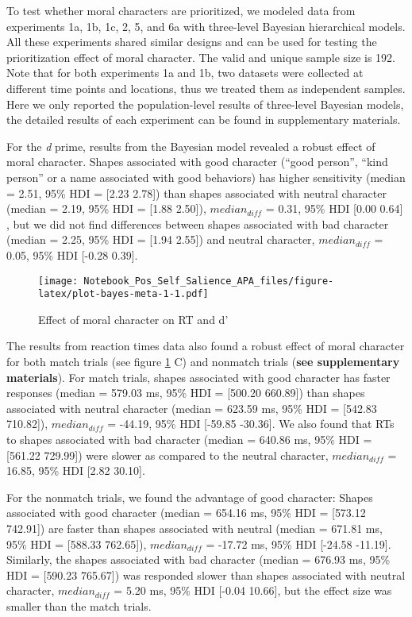 \documentclass[
  man]{apa6}
\begin{document}
To test whether moral characters are prioritized, we modeled data from experiments 1a, 1b, 1c, 2, 5, and 6a with three-level Bayesian hierarchical models. All these experiments shared similar designs and can be used for testing the prioritization effect of moral character. The valid and unique sample size is 192. Note that for both experiments 1a and 1b, two datasets were collected at different time points and locations, thus we treated them as independent samples. Here we only reported the population-level results of three-level Bayesian models, the detailed results of each experiment can be found in supplementary materials.

For the \emph{d} prime, results from the Bayesian model revealed a robust effect of moral character. Shapes associated with good character (``good person'', ``kind person'' or a name associated with good behaviors) has higher sensitivity (median = 2.51, 95\% HDI = {[}2.23 2.78{]}) than shapes associated with neutral character (median = 2.19, 95\% HDI = {[}1.88 2.50{]}), \(median_{diff}\) = 0.31, 95\% HDI {[}0.00 0.64{]} , but we did not find differences between shapes associated with bad character (median = 2.25, 95\% HDI = {[}1.94 2.55{]}) and neutral character, \(median_{diff}\) = 0.05, 95\% HDI {[}-0.28 0.39{]}.

\begin{figure}
\centering
\texttt{[image: Notebook\_Pos\_Self\_Salience\_APA\_files/figure-latex/plot-bayes-meta-1-1.pdf]}
\caption{\label{fig:plot-bayes-meta-1}Effect of moral character on RT and d'}
\end{figure}

The results from reaction times data also found a robust effect of moral character for both match trials (see figure \ref{fig:plot-bayes-meta-1} C) and nonmatch trials (\textbf{see supplementary materials}). For match trials, shapes associated with good character has faster responses (median = 579.03 ms, 95\% HDI = {[}500.20 660.89{]}) than shapes associated with neutral character (median = 623.59 ms, 95\% HDI = {[}542.83 710.82{]}), \(median_{diff}\) = -44.19, 95\% HDI {[}-59.85 -30.36{]}. We also found that RTs to shapes associated with bad character (median = 640.86 ms, 95\% HDI = {[}561.22 729.99{]}) were slower as compared to the neutral character, \(median_{diff}\) = 16.85, 95\% HDI {[}2.82 30.10{]}.

For the nonmatch trials, we found the advantage of good character: Shapes associated with good character (median = 654.16 ms, 95\% HDI = {[}573.12 742.91{]}) are faster than shapes associated with neutral (median = 671.81 ms, 95\% HDI = {[}588.33 762.65{]}), \(median_{diff}\) = -17.72 ms, 95\% HDI {[}-24.58 -11.19{]}. Similarly, the shapes associated with bad character (median = 676.93 ms, 95\% HDI = {[}590.23 765.67{]}) was responded slower than shapes associated with neutral character, \(median_{diff}\) = 5.20 ms, 95\% HDI {[}-0.04 10.66{]}, but the effect size was smaller than the match trials.
\end{document}
